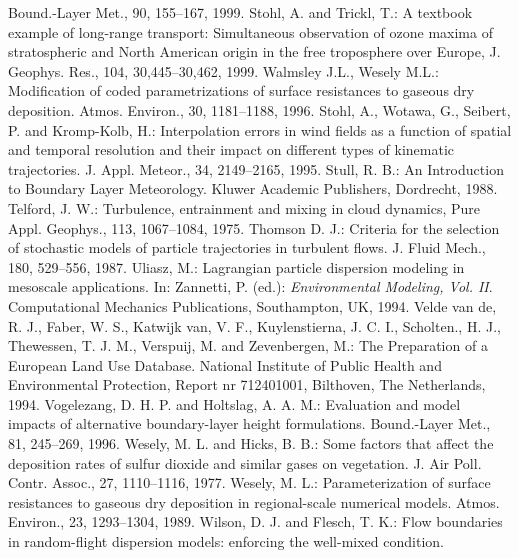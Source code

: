 \documentclass{egu}            %
\begin{document}
\begin{thebibliography}{}
Bound.-Layer Met., 90, 155--167, 1999.
Stohl, A. and Trickl, T.:
A textbook example of long-range transport: Simultaneous observation of ozone maxima of stratospheric and North American origin in the free troposphere over Europe,
J. Geophys. Res., 104, 30,445--30,462, 1999.
Walmsley J.L., Wesely M.L.: 
Modification of coded parametrizations of surface resistances to gaseous dry deposition.  
Atmos. Environ., 30, 1181--1188, 1996. 
Stohl, A., Wotawa, G., Seibert, P. and Kromp-Kolb, H.:
Interpolation errors in wind fields as a function of spatial and temporal resolution and their impact on different types of kinematic trajectories.
J. Appl. Meteor., 34, 2149--2165, 1995.
Stull, R. B.:
An Introduction to Boundary Layer Meteorology. Kluwer Academic Publishers, Dordrecht, 1988.
Telford, J. W.:
Turbulence, entrainment and mixing in cloud dynamics,
Pure Appl. Geophys., 113, 1067--1084, 1975.
Thomson D. J.:
Criteria for the selection of stochastic models of particle trajectories in turbulent flows.
J. Fluid Mech., 180, 529--556, 1987.
Uliasz, M.:
Lagrangian particle dispersion modeling in mesoscale applications. In: Zannetti, P. (ed.): {\it Environmental Modeling, Vol. II}. Computational Mechanics Publications, Southampton, UK, 1994.
Velde van de, R. J., Faber, W. S., Katwijk van, V. F., Kuylenstierna, J. C. I., Scholten., H. J., Thewessen, T. J. M., Verspuij, M. and Zevenbergen, M.:
The Preparation of a European Land Use Database. National Institute of Public Health and Environmental Protection, Report nr 712401001, Bilthoven, The Netherlands, 1994.
Vogelezang, D. H. P. and Holtslag, A. A. M.:
Evaluation and model impacts of alternative boundary-layer height formulations.
Bound.-Layer Met., 81, 245--269, 1996.
Wesely, M. L. and Hicks, B. B.:
Some factors that affect the deposition rates of sulfur dioxide and similar gases on vegetation.
J. Air Poll. Contr. Assoc., 27, 1110--1116, 1977.
Wesely, M. L.:
Parameterization of surface resistances to gaseous dry deposition in regional-scale numerical models.
Atmos. Environ., 23, 1293--1304, 1989.
Wilson, D. J. and Flesch, T. K.:
Flow boundaries in random-flight dispersion models: enforcing the well-mixed condition.

\end{thebibliography}
\end{document}
